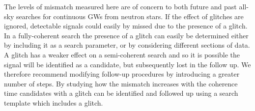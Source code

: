 \documentclass[../full_thesis/full_thesis.tex]{subfiles}
\begin{document}
The levels of mismatch measured here are of concern to both future and past
all-sky searches for continuous GWs from neutron stars. If the effect of
glitches are ignored, detectable signals could easily by missed due to the
presence of a glitch. In a fully-coherent search the presence of a glitch can
easily be determined either by including it as a search parameter, or by
considering different sections of data. A glitch has a weaker effect on a
semi-coherent search and so it is possible the signal will be identified as a
candidate, but subsequently lost in the follow up.  We therefore recommend
modifying follow-up procedures by introducing a greater number of steps. By
studying how the mismatch increases with the coherence time candidates with a
glitch can be identified and followed up using a search template which includes
a glitch.

\end{document}
